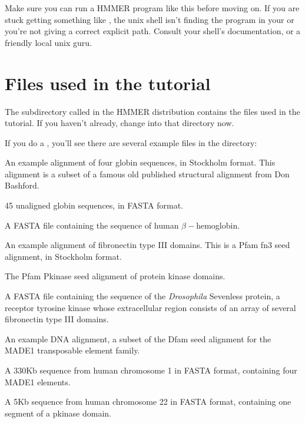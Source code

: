   \vspace{1ex}
  \vspace{1ex}

Make sure you can run a HMMER program like this before moving on.  If
you are stuck getting something like , the unix shell isn't finding the program in your 
or you're not giving a correct explicit path. Consult your shell's
documentation, or a friendly local unix guru.

\section{Files used in the tutorial}

The subdirectory called  in the HMMER distribution
contains the files used in the tutorial. If you haven't already,
change into that directory now. 

  \vspace{1ex}
  \vspace{1ex}

If you do a , you'll see there are several example files in
the  directory:

\begin{sreitems}{}
\item[\monob{globins4.sto}] An example alignment of four globin sequences, in
  Stockholm format. This alignment is a subset of a famous old
  published structural alignment from Don Bashford.\cite{Bashford87}
%
\item[\monob{globins45.fa}] 45 unaligned globin sequences, in FASTA
  format.
%
\item[\monob{HBB\_HUMAN}] A FASTA file containing the sequence of
  human $\beta-$hemoglobin.
%
\item[\monob{fn3.sto}] An example alignment of fibronectin type III
  domains. This is a Pfam fn3 seed alignment, in Stockholm format.
%
\item[\monob{Pkinase.sto}] The Pfam Pkinase seed alignment of protein
  kinase domains.
%
\item[\monob{7LESS\_DROME}] A FASTA file containing the sequence of
  the \emph{Drosophila} Sevenless protein, a receptor tyrosine kinase
  whose extracellular region consists of an array of several
  fibronectin type III domains.
%
\item[\monob{MADE1.sto}] An example DNA alignment, a subset
of the Dfam seed alignment for the MADE1 transposable element family. 
%
\item[\monob{dna\_made1\_target.fa}] A 330Kb sequence from human chromosome
  1 in FASTA format, containing four MADE1 elements.
%
\item[\monob{dna\_pkinase\_target.fa}] A 5Kb sequence from human chromosome
  22 in FASTA format, containing one segment of a pkinase domain.
\item[]
\end{sreitems}


